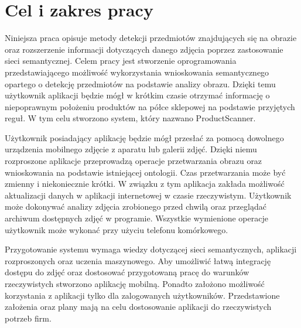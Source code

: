 \section{Cel i zakres pracy}
Niniejsza praca opisuje metody detekcji przedmiotów znajdujących się na obrazie oraz rozszerzenie informacji dotyczących danego zdjęcia poprzez zastosowanie sieci semantycznej. Celem pracy jest stworzenie oprogramowania przedstawiającego możliwość wykorzystania wnioskowania semantycznego opartego o detekcję przedmiotów na podstawie analizy obrazu. Dzięki temu użytkownik aplikacji będzie mógł w krótkim czasie otrzymać informację o niepoprawnym położeniu produktów na półce sklepowej na podstawie przyjętych reguł. W tym celu stworzono system, który nazwano ProductScanner.

Użytkownik posiadający aplikację będzie mógł przesłać za pomocą dowolnego urządzenia mobilnego zdjęcie z aparatu lub galerii zdjęć. Dzięki niemu rozproszone aplikacje przeprowadzą operacje przetwarzania obrazu oraz wnioskowania na podstawie istniejącej ontologii. Czas przetwarzania może być zmienny i niekoniecznie krótki. W związku z tym aplikacja zakłada możliwość aktualizacji danych w aplikacji internetowej w czasie rzeczywistym. Użytkownik może dokonywać analizy zdjęcia zrobionego przed chwilą oraz przeglądać archiwum dostępnych zdjęć w programie. Wszystkie wymienione operacje użytkownik może wykonać przy użyciu telefonu komórkowego.

Przygotowanie systemu wymaga wiedzy dotyczącej sieci semantycznych, aplikacji rozproszonych oraz uczenia maszynowego. Aby umożliwić łatwą integrację dostępu do zdjęć oraz dostosować przygotowaną pracę do warunków rzeczywistych stworzono aplikację mobilną. Ponadto założono możliwość korzystania z aplikacji tylko dla zalogowanych użytkowników. Przedstawione założenia oraz plany mają na celu dostosowanie aplikacji do rzeczywistych potrzeb firm.


